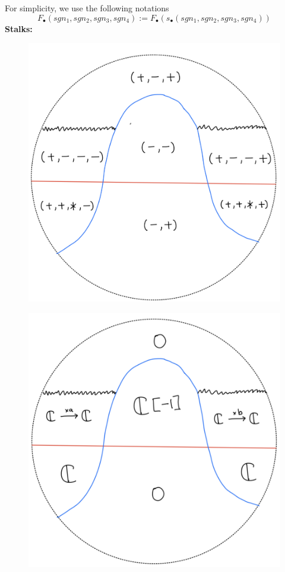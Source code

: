 For simplicity, we use the following notations
\[
F_\bullet(sgn_1,sgn_2,sgn_3,sgn_4):=F_\bullet(s_\bullet(sgn_1,sgn_2,sgn_3,sgn_4))
\]
\textbf{Stalks:}
\begin{figure}[H]
    \centering
    \includegraphics[scale = 0.95]{diagrams/lemma2/30.png} 
    \caption{}
    \label{fig:your-label}
\end{figure}
\begin{figure}[H]
    \centering
    \includegraphics[scale = 0.95]{diagrams/lemma2/31.png} 
    \caption{}
    \label{fig:your-label}
\end{figure}

